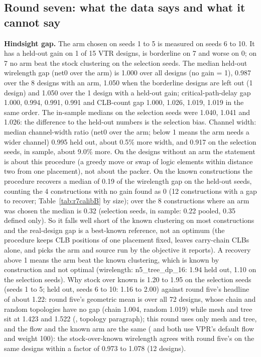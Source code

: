 \subsection{Round seven: what the data says and what it cannot say}
\label{sec:r7-discussion}
\textbf{Hindsight gap.} The arm chosen on seeds 1 to 5 is measured on seeds 6 to 10. It has a held-out gain on 1 of 15 VTR designs, is borderline on 7 and worse on 0; on 7 no arm beat the stock clustering on the selection seeds. The median held-out wirelength gap (net0 over the arm) is 1.000 over all designs (no gain = 1),
0.987 over the 8 designs with an arm, 1.050 when the borderline designs are left out (1 design) and 1.050 over the 1 design with a held-out gain; critical-path-delay gap 1.000, 0.994, 0.991, 0.991 and CLB-count gap 1.000, 1.026, 1.019, 1.019 in the same order. The in-sample medians on the selection seeds were 1.040, 1.041 and 1.026: the difference to the held-out numbers is the selection bias.
Channel width: median channel-width ratio (net0 over the arm; below 1 means the arm needs a wider channel) 0.995 held out, about 0.5\% more width, and 0.917 on the selection seeds, in sample, about 9.0\% more. On the designs without an arm the statement is about this procedure (a greedy move or swap of logic elements within
distance two from one placement), not about the packer. On the known constructions the procedure recovers a median of 0.19 of the wirelength gap on the held-out seeds, counting the 4 constructions with no gain found as 0 (12 constructions with a gap to recover; Table~\ref{tab:r7calibB} by size); over the 8 constructions where an arm was chosen the median is 0.32
(selection seeds, in sample: 0.22 pooled, 0.35 defined only). So it falls well short of the known clustering on most constructions and the real-design gap is a best-known reference, not an optimum
(the procedure keeps CLB positions of one placement fixed, leaves carry-chain CLBs alone, and picks the arm and source run by the objective it reports). A recovery above 1 means the arm beat the known clustering, which is known by construction and not optimal (wirelength: n5\_tree\_dp\_16: 1.94 held out, 1.10 on the selection seeds).
Why stock over known is 1.20 to 1.95 on the selection seeds (seeds 1 to 5; held out, seeds 6 to 10: 1.16 to 2.00) against round five's headline of
about 1.22: round five's geometric mean is over all 72 designs, whose chain and random topologies have no gap (chain 1.004, random 1.019) while mesh and tree sit at 1.423 and 1.522
(, topology paragraph); this round uses only mesh and tree, and the flow and the known arm are the same (  and   both use VPR's default flow and weight 100):
the stock-over-known wirelength agrees with round five's on the same designs within a factor of 0.973 to 1.078 (12 designs).

